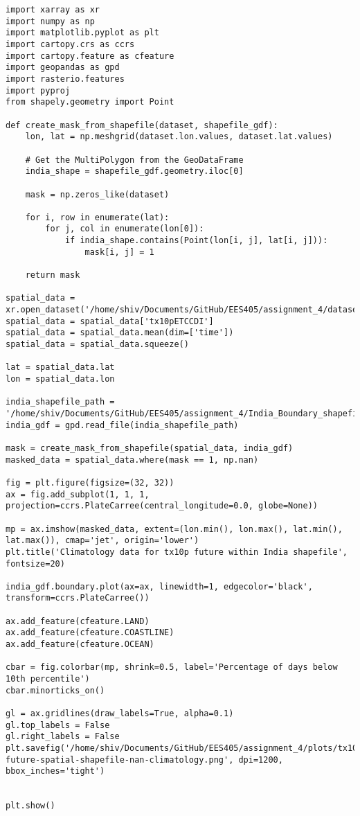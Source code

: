 \documentclass[a4paper, 12pt, twoside]{report}
\begin{document}
\begin{lstlisting}
import xarray as xr
import numpy as np
import matplotlib.pyplot as plt
import cartopy.crs as ccrs
import cartopy.feature as cfeature
import geopandas as gpd
import rasterio.features
import pyproj
from shapely.geometry import Point

def create_mask_from_shapefile(dataset, shapefile_gdf):
    lon, lat = np.meshgrid(dataset.lon.values, dataset.lat.values)
    
    # Get the MultiPolygon from the GeoDataFrame
    india_shape = shapefile_gdf.geometry.iloc[0]
    
    mask = np.zeros_like(dataset)

    for i, row in enumerate(lat):
        for j, col in enumerate(lon[0]):
            if india_shape.contains(Point(lon[i, j], lat[i, j])):
                mask[i, j] = 1

    return mask

spatial_data = xr.open_dataset('/home/shiv/Documents/GitHub/EES405/assignment_4/datasets/tx10p.india.future.nc')
spatial_data = spatial_data['tx10pETCCDI']
spatial_data = spatial_data.mean(dim=['time'])
spatial_data = spatial_data.squeeze()

lat = spatial_data.lat
lon = spatial_data.lon

india_shapefile_path = '/home/shiv/Documents/GitHub/EES405/assignment_4/India_Boundary_shapefile/India_Boundary.shp'
india_gdf = gpd.read_file(india_shapefile_path)

mask = create_mask_from_shapefile(spatial_data, india_gdf)
masked_data = spatial_data.where(mask == 1, np.nan)

fig = plt.figure(figsize=(32, 32))
ax = fig.add_subplot(1, 1, 1, projection=ccrs.PlateCarree(central_longitude=0.0, globe=None))

mp = ax.imshow(masked_data, extent=(lon.min(), lon.max(), lat.min(), lat.max()), cmap='jet', origin='lower')
plt.title('Climatology data for tx10p future within India shapefile', fontsize=20)

india_gdf.boundary.plot(ax=ax, linewidth=1, edgecolor='black', transform=ccrs.PlateCarree())

ax.add_feature(cfeature.LAND)
ax.add_feature(cfeature.COASTLINE)
ax.add_feature(cfeature.OCEAN)

cbar = fig.colorbar(mp, shrink=0.5, label='Percentage of days below 10th percentile')
cbar.minorticks_on()

gl = ax.gridlines(draw_labels=True, alpha=0.1)
gl.top_labels = False
gl.right_labels = False
plt.savefig('/home/shiv/Documents/GitHub/EES405/assignment_4/plots/tx10p-future-spatial-shapefile-nan-climatology.png', dpi=1200, bbox_inches='tight')


plt.show()

\end{lstlisting}
\end{document}
